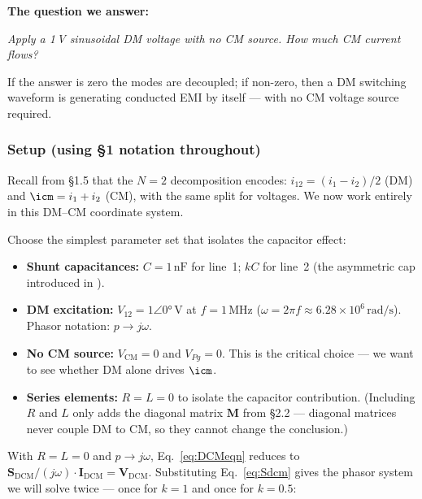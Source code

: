 \medskip
\textbf{The question we answer:}
\begin{center}
\emph{Apply a 1\,V sinusoidal DM voltage with no CM source.
      How much CM current flows?}
\end{center}
If the answer is zero the modes are decoupled; if non-zero, then a
DM switching waveform is generating conducted EMI by itself — with
no CM voltage source required.

\subsubsection*{Setup (using \S1 notation throughout)}

Recall from \S1.5 that the $N = 2$ decomposition encodes:
$i_{12} = (i_1 - i_2)/2$ (DM) and $\icm = i_1 + i_2$ (CM),
with the same split for voltages.
We now work entirely in this DM--CM coordinate system.

Choose the simplest parameter set that isolates the capacitor effect:

\begin{itemize}
    \item \textbf{Shunt capacitances:} $C = 1\,\text{nF}$ for
          line~1; $kC$ for line~2 (the asymmetric cap introduced
          in ).
    \item \textbf{DM excitation:} $V_{12} = 1\angle 0°\,\text{V}$
          at $f = 1\,\text{MHz}$ ($\omega = 2\pi f \approx
          6.28 \times 10^6\,\text{rad/s}$).  Phasor notation:
          $p \to j\omega$.
    \item \textbf{No CM source:} $V_{\mathrm{CM}} = 0$ and
          $V_{Pg} = 0$.  This is the critical choice — we want
          to see whether DM alone drives $\icm$.
    \item \textbf{Series elements:} $R = L = 0$ to isolate the
          capacitor contribution.  (Including $R$ and $L$ only
          adds the diagonal matrix $\mathbf{M}$ from \S2.2 —
          diagonal matrices never couple DM to CM, so they
          cannot change the conclusion.)
\end{itemize}

With $R = L = 0$ and $p \to j\omega$, Eq.~\eqref{eq:DCMeqn}
reduces to
$\mathbf{S}_{\mathrm{DCM}}/(j\omega) \cdot \mathbf{I}_{\mathrm{DCM}}
= \mathbf{V}_{\mathrm{DCM}}$.
Substituting Eq.~\eqref{eq:Sdcm} gives the phasor system we will
solve twice — once for $k = 1$ and once for $k = 0.5$:

